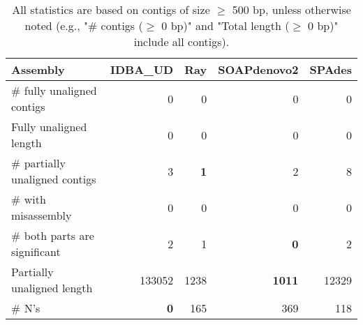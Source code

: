 \documentclass[12pt,a4paper]{article}
\begin{document}
\begin{table}[ht]
\begin{center}
\caption{All statistics are based on contigs of size $\geq$ 500 bp, unless otherwise noted (e.g., "\# contigs ($\geq$ 0 bp)" and "Total length ($\geq$ 0 bp)" include all contigs).}
\begin{tabular}{|l*{4}{|r}|}
\hline
Assembly & IDBA\_UD & Ray & SOAPdenovo2 & SPAdes \\ \hline
\# fully unaligned contigs & 0 & 0 & 0 & 0 \\ \hline
Fully unaligned length & 0 & 0 & 0 & 0 \\ \hline
\# partially unaligned contigs & 3 & {\bf 1} & 2 & 8 \\ \hline
\hspace{5mm}\# with misassembly & 0 & 0 & 0 & 0 \\ \hline
\hspace{5mm}\# both parts are significant & 2 & 1 & {\bf 0} & 2 \\ \hline
Partially unaligned length & 133052 & 1238 & {\bf 1011} & 12329 \\ \hline
\# N's & {\bf 0} & 165 & 369 & 118 \\ \hline
\end{tabular}
\end{center}
\end{table}
\end{document}
